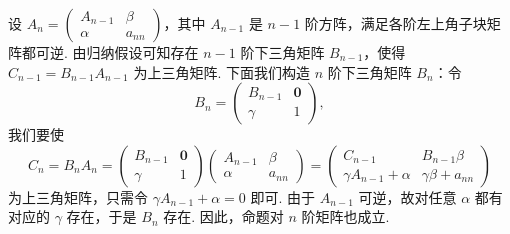 \begin{exercise}
\begin{exgroup}
\begin{answer}
            设 $A_n = \begin{pmatrix}
                A_{n-1} & \beta \\
                \alpha  & a_{nn}
            \end{pmatrix}$，其中 $A_{n-1}$ 是 $n-1$ 阶方阵，满足各阶左上角子块矩阵都可逆. 由归纳假设可知存在 $n-1$ 阶下三角矩阵 $B_{n-1}$，使得 $C_{n-1} = B_{n-1}A_{n-1}$ 为上三角矩阵. 下面我们构造 $n$ 阶下三角矩阵 $B_n$：令
            \[
                B_n = \begin{pmatrix}
                    B_{n-1} & \mathbf{0} \\
                    \gamma  & 1
                \end{pmatrix},
            \]
            我们要使
            \[
                C_n = B_n A_n = \begin{pmatrix}
                    B_{n-1} & \mathbf{0} \\
                    \gamma  & 1
                \end{pmatrix} \begin{pmatrix}
                    A_{n-1} & \beta \\
                    \alpha  & a_{nn}
                \end{pmatrix} = \begin{pmatrix}
                    C_{n-1}                 & B_{n-1} \beta         \\
                    \gamma A_{n-1} + \alpha & \gamma \beta + a_{nn}
                \end{pmatrix}
            \]
            为上三角矩阵，只需令 $\gamma A_{n-1} + \alpha = 0$ 即可. 由于 $A_{n-1}$ 可逆，故对任意 $\alpha$ 都有对应的 $\gamma$ 存在，于是 $B_n$ 存在. 因此，命题对 $n$ 阶矩阵也成立.

        \end{answer}


\end{exgroup}
\end{exercise}

